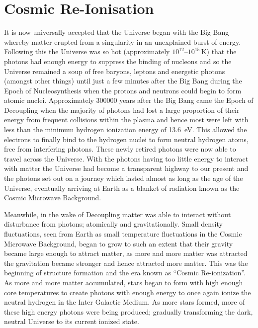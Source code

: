 
\section{Cosmic Re-Ionisation} %
\label{sec:cosmic_re_ionisation}
	It is now universally accepted that the Universe began with the Big Bang whereby matter erupted from a singularity in an unexplained burst of energy. Following this the Universe was so hot (approximately $10^{12}$--$10^{15}$\,\si{\kelvin}\cite{liddle2003introduction}) that the photons had enough energy to suppress the binding of nucleons and so the Universe remained a soup of free baryons, leptons and energetic photons (amongst other things) until just a few minutes after the Big Bang during the Epoch of Nucleosynthesis when the protons and neutrons could begin to form atomic nuclei. Approximately \num{300000} years after the Big Bang came the Epoch of Decoupling when the majority of photons had lost a large proportion of their energy from frequent collisions within the plasma and hence most were left with less than the minimum hydrogen ionization energy of \SI{13.6}{\electronvolt}\cite{liddle2003introduction}. This allowed the electrons to finally bind to the hydrogen nuclei to form neutral hydrogen atoms, free from interfering photons. These newly retired photons were now able to travel across the Universe. With the photons having too little energy to interact with matter the Universe had become a transparent highway to our present and the photons set out on a journey which lasted almost as long as the age of the Universe, eventually arriving at Earth as a blanket of radiation known as the Cosmic Microwave Background.

	Meanwhile, in the wake of Decoupling matter was able to interact without disturbance from photons; atomically and gravitationally. Small density fluctuations, seen from Earth as small temperature fluctuations in the Cosmic Microwave Background, began to grow to such an extent that their gravity became large enough to attract matter, as more and more matter was attracted the gravitation became stronger and hence attracted more matter. This was the beginning of structure formation and the era known as ``Cosmic Re-ionization''. As more and more matter accumulated, stars began to form with high enough core temperatures to create photons with enough energy to once again ionize the neutral hydrogen in the Inter Galactic Medium. As more stars formed, more of these high energy photons were being produced; gradually transforming the dark, neutral Universe to its current ionized state.


